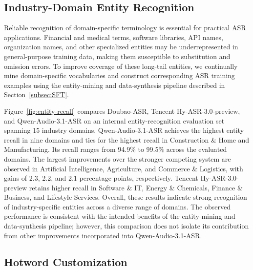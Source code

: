 \documentclass{article}
\begin{document}
\subsection{Industry-Domain Entity Recognition}
\label{subsec:industry-terms}

Reliable recognition of domain-specific terminology is essential for practical ASR applications. Financial and medical terms, software libraries, API names, organization names, and other specialized entities may be underrepresented in general-purpose training data, making them susceptible to substitution and omission errors. To improve coverage of these long-tail entities, we continually mine domain-specific vocabularies and construct corresponding ASR training examples using the entity-mining and data-synthesis pipeline described in Section~\ref{subsec:SFT}.

Figure~\ref{fig:entity-recall} compares Doubao-ASR, Tencent Hy-ASR-3.0-preview, and Qwen-Audio-3.1-ASR on an internal entity-recognition evaluation set spanning 15 industry domains. Qwen-Audio-3.1-ASR achieves the highest entity recall in nine domains and ties for the highest recall in Construction \& Home and Manufacturing. Its recall ranges from 94.9\% to 99.5\% across the evaluated domains. The largest improvements over the stronger competing system are observed in Artificial Intelligence, Agriculture, and Commerce \& Logistics, with gains of 2.3, 2.2, and 2.1 percentage points, respectively. Tencent Hy-ASR-3.0-preview retains higher recall in Software \& IT, Energy \& Chemicals, Finance \& Business, and Lifestyle Services. Overall, these results indicate strong recognition of industry-specific entities across a diverse range of domains. The observed performance is consistent with the intended benefits of the entity-mining and data-synthesis pipeline; however, this comparison does not isolate its contribution from other improvements incorporated into Qwen-Audio-3.1-ASR.

%
%
%
%
%
%
%
%
%
%
%
%
%
%
%
%
%
%
%
%
%
%
%
%

\subsection{Hotword Customization}
\label{subsec:hotword}
\end{document}
